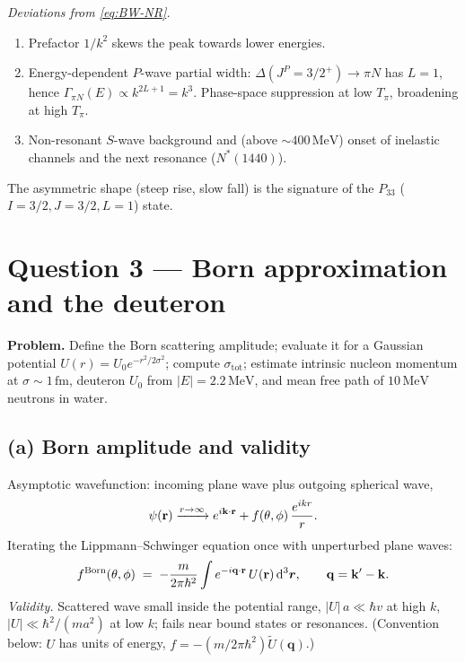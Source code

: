 \documentclass[11pt]{article}
\newcommand{\de}{\mathrm{d}}
\begin{document}
\begin{center}
\end{center}

\emph{Deviations from \eqref{eq:BW-NR}.}
\begin{enumerate}
\item Prefactor $1/k^{2}$ skews the peak towards lower energies.
\item Energy-dependent $P$-wave partial width: $\Delta(J^{P}=3/2^{+})\to\pi N$ has $L=1$, hence $\Gamma_{\pi N}(E)\propto k^{2L+1}=k^{3}$. Phase-space suppression at low $T_{\pi}$, broadening at high $T_{\pi}$.
\item Non-resonant $S$-wave background and (above $\sim 400\,\text{MeV}$) onset of inelastic channels and the next resonance ($N^{*}(1440)$).
\end{enumerate}
The asymmetric shape (steep rise, slow fall) is the signature of the $P_{33}$ ($I=3/2,J=3/2,L=1$) state.

\section*{Question 3 --- Born approximation and the deuteron}

\textbf{Problem.} Define the Born scattering amplitude; evaluate it for a Gaussian potential $U(r)=U_{0}e^{-r^{2}/2\sigma^{2}}$; compute $\sigma_\text{tot}$; estimate intrinsic nucleon momentum at $\sigma\sim 1\,\text{fm}$, deuteron $U_{0}$ from $|E|=2.2\,\text{MeV}$, and mean free path of $10\,\text{MeV}$ neutrons in water.

\subsection*{(a) Born amplitude and validity}

Asymptotic wavefunction: incoming plane wave plus outgoing spherical wave,
\[
\psi(\vb r)\xrightarrow{r\to\infty}e^{i\vb k\cdot\vb r}+f(\theta,\phi)\,\frac{e^{ikr}}{r}.
\]
Iterating the Lippmann--Schwinger equation once with unperturbed plane waves:
\begin{equation}
f^\text{Born}(\theta,\phi)\;=\;-\frac{m}{2\pi\hbar^{2}}\int e^{-i\vb q\cdot\vb r}\,U(\vb r)\,\de^{3}\bm r,\qquad\vb q=\vb k'-\vb k.
\label{eq:fBorn-def}
\end{equation}
\emph{Validity.} Scattered wave small inside the potential range, $|U|\,a\ll\hbar v$ at high $k$, $|U|\ll\hbar^{2}/(ma^{2})$ at low $k$; fails near bound states or resonances. (Convention below: $U$ has units of energy, $f=-(m/2\pi\hbar^{2})\tilde U(\bm q)$.)
\end{document}
